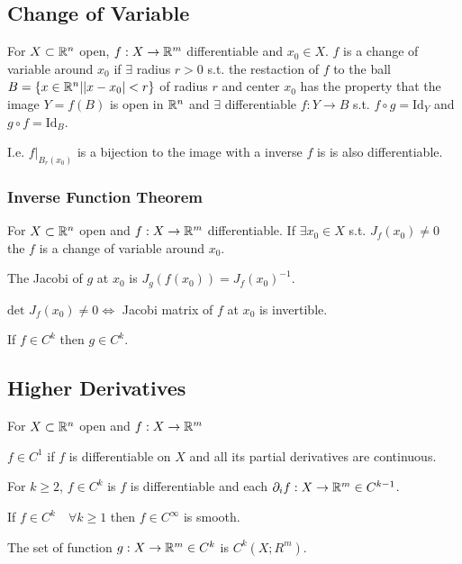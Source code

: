 \subsection{Change of Variable}
For $X \subset \mathbb{R}^n$ open, $f: X \to \mathbb{R}^m$ differentiable and $x_0 \in X$. $f$ is a change of variable around $x_0$ if $\exists$ radius $r > 0$ s.t. the restaction of $f$ to the ball $B = \{x \in \mathbb{R}^n | |x - x_0| < r\}$ of radius $r$ and center $x_0$ has the property that the image $Y = f(B)$ is open in $\mathbb{R}^n$ and $\exists$ differentiable $f: Y \to B$ s.t. $f \circ g = \text{Id}_Y$ and $g \circ f = \text{Id}_B$.

\begin{compactitem}
    \item I.e. $f|_{B_r(x_0)}$ is a bijection to the image with a inverse $f$ is is also differentiable.
\end{compactitem}

\subsubsection{Inverse Function Theorem}
For $X \subset \mathbb{R}^n$ open and $f: X \to \mathbb{R}^m$ differentiable. If $\exists x_0 \in X$ s.t. $J_f(x_0) \neq 0$ the $f$ is a change of variable around $x_0$.

\begin{compactitem}
    \item The Jacobi of $g$ at $x_0$ is $J_g(f(x_0)) = J_f(x_0)^{-1}$.
    \item $\text{det }J_f(x_0) \neq 0 \iff$ Jacobi matrix of $f$ at $x_0$ is invertible.
    \item If $f \in C^k$ then $g \in C^k$.
\end{compactitem}

\subsection{Higher Derivatives}
For $X \subset \mathbb{R}^n$ open and $f: X \to \mathbb{R}^m$
\begin{compactitem}
    \item $f \in C^1$ if $f$ is differentiable on $X$ and all its partial derivatives are continuous.
    \item For $k \ge 2$, $f \in C^k$ is $f$ is differentiable and each $\partial_i f: X \to \mathbb{R}^m \in C^{k-1}$.
    \item If $f \in C^k \quad \forall k \ge 1$ then $f \in C^\infty$ is smooth.
    \item The set of function $g: X \to \mathbb{R}^m \in C^k$ is $C^k(X; R^m)$.
\end{compactitem}

